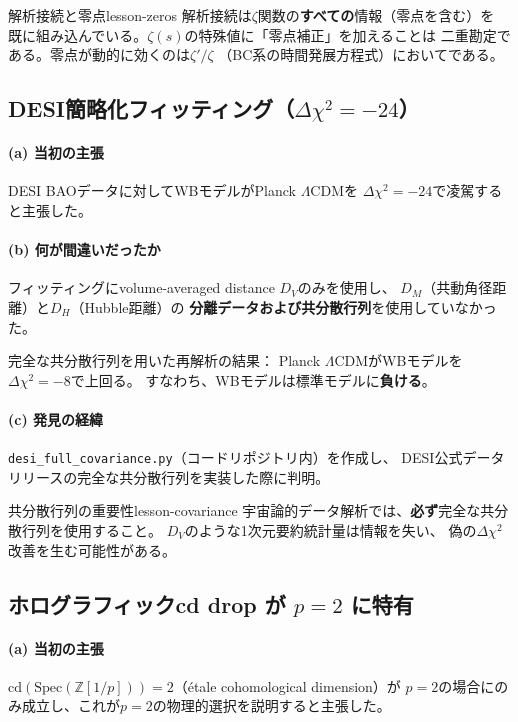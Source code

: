 \documentclass[11pt,a4paper]{article}
\newcommand{\Spec}{\mathrm{Spec}}
\newcommand{\cd}{\mathrm{cd}}
\begin{document}
\begin{keylesson}{解析接続と零点}{lesson-zeros}
解析接続は$\zeta$関数の\textbf{すべての}情報（零点を含む）を
既に組み込んでいる。$\zeta(s)$の特殊値に「零点補正」を加えることは
二重勘定である。零点が動的に効くのは$\zeta'/\zeta$
（BC系の時間発展方程式）においてである。
\end{keylesson}


\subsection{DESI簡略化フィッティング（$\Delta\chi^2 = -24$）}
\label{sec:15.2}

\paragraph{(a) 当初の主張}
DESI BAOデータに対してWBモデルがPlanck $\Lambda$CDMを
$\Delta\chi^2 = -24$で凌駕すると主張した。

\paragraph{(b) 何が間違いだったか}
フィッティングにvolume-averaged distance $D_V$のみを使用し、
$D_M$（共動角径距離）と$D_H$（Hubble距離）の
\textbf{分離データおよび共分散行列}を使用していなかった。

完全な共分散行列を用いた再解析の結果：
Planck $\Lambda$CDMがWBモデルを$\Delta\chi^2 = -8$で上回る。
すなわち、WBモデルは標準モデルに\textbf{負ける}。

\paragraph{(c) 発見の経緯}
\texttt{desi\_full\_covariance.py}（コードリポジトリ内）を作成し、
DESI公式データリリースの完全な共分散行列を実装した際に判明。

\begin{keylesson}{共分散行列の重要性}{lesson-covariance}
宇宙論的データ解析では、\textbf{必ず}完全な共分散行列を使用すること。
$D_V$のような1次元要約統計量は情報を失い、
偽の$\Delta\chi^2$改善を生む可能性がある。
\end{keylesson}


\subsection{ホログラフィックcd drop が $p=2$ に特有}
\label{sec:15.3}

\paragraph{(a) 当初の主張}
$\cd(\Spec(\mathbb{Z}[1/p])) = 2$（\'etale cohomological dimension）が
$p = 2$の場合にのみ成立し、これが$p = 2$の物理的選択を説明すると主張した。
\end{document}
